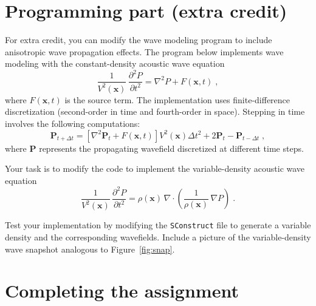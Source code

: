 \lstset{language=python,numbers=left,numberstyle=\tiny,showstringspaces=false}


\section{Programming part (extra credit)}

For extra credit, you can modify the wave modeling program to include
anisotropic wave propagation effects. The program below implements
wave modeling with the constant-density acoustic wave equation
\begin{equation}
  \label{eq:cdens}
   \frac{1}{V^2(\mathbf{x})}\,\frac{\partial^2 P}{\partial t^2} =
   \nabla^2 P + F(\mathbf{x},t)\;,
\end{equation} 
where $F(\mathbf{x},t)$ is the source term. The implementation uses
finite-difference discretization (second-order in time and fourth-order in space). 
Stepping in time involves the following computations:
\begin{equation}
  \mathbf{P}_{t+\Delta t} = \left[ \nabla^2 \mathbf{P}_t + F(\mathbf{x},t)\right] V^2(\mathbf{x}) \Delta t^2 + 2 \mathbf{P}_{t} - \mathbf{P}_{t-\Delta t} \;,
  \label{eq:step}
\end{equation}
where $\mathbf{P}$ represents the propagating wavefield discretized at different time steps.

\lstset{language=c,numbers=left,numberstyle=\tiny,showstringspaces=false}


Your task is to modify the code to implement the variable-density acoustic wave equation
\begin{equation}
  \label{eq:vdens}
  \frac{1}{V^2(\mathbf{x})}\,\frac{\partial^2 P}{\partial t^2} =
  \rho(\mathbf{x})\, \nabla \cdot 
  \left(\frac{1}{\rho(\mathbf{x})}\,\nabla P\right)\;.
\end{equation} 

Test your implementation by modifying the \texttt{SConstruct} file to
generate a variable density and the corresponding wavefields. Include
a picture of the variable-density wave snapshot analogous to Figure~\ref{fig:snap}.

\section{Completing the assignment}

